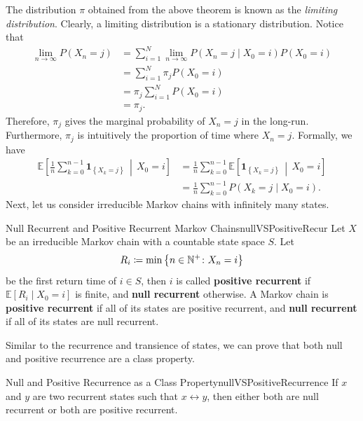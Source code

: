 \documentclass[math, code]{amznotes}
\theoremstyle{remark}
\begin{document}
The distribution $\pi$ obtained from the above theorem is known as the \textit{limiting distribution}. Clearly, a limiting distribution is a stationary distribution. Notice that 
\begin{align*}
    \lim_{n \to \infty}P\left(X_n = j\right) & = \sum_{i = 1}^{N} \lim_{n \to \infty}P\left(X_n = j \mid X_0 = i\right)P\left(X_0 = i\right) \\
    & = \sum_{i = 1}^{N}\pi_jP\left(X_0 = i\right) \\
    & = \pi_j\sum_{i = 1}^{N}P\left(X_0 = i\right) \\
    & = \pi_j.
\end{align*}
Therefore, $\pi_j$ gives the marginal probability of $X_n = j$ in the long-run. Furthermore, $\pi_j$ is intuitively the proportion of time where $X_n = j$. Formally, we have 
\begin{align*}
    \mathbb{E}\left[\frac{1}{n}\sum_{k = 0}^{n - 1}\mathbf{1}_{\left\{X_k = j\right\}} \,\middle\vert\, X_0 = i\right] & = \frac{1}{n}\sum_{k = 0}^{n - 1}\mathbb{E}\left[\mathbf{1}_{\left\{X_k = j\right\}} \,\middle\vert\, X_0 = i\right] \\
    & = \frac{1}{n}\sum_{k = 0}^{n - 1}P\left(X_k = j \mid X_0 = i\right).
\end{align*}
Next, let us consider irreducible Markov chains with infinitely many states.
\begin{dfnbox}{Null Recurrent and Positive Recurrent Markov Chains}{nullVSPositiveRecur}
    Let $X$ be an irreducible Markov chain with a countable state space $S$. Let 
    \begin{equation*}
        R_i \coloneqq \min\left\{n \in \mathbb{N}^+ \colon X_n = i\right\}
    \end{equation*}
    be the first return time of $i \in S$, then $i$ is called {\color{red} \textbf{positive recurrent}} if $\mathbb{E}\left[R_i \mid X_0 = i\right]$ is finite, and {\color{red} \textbf{null recurrent}} otherwise. A Markov chain is {\color{red} \textbf{positive recurrent}} if all of its states are positive recurrent, and {\color{red} \textbf{null recurrent}} if all of its states are null recurrent.
\end{dfnbox}
Similar to the recurrence and transience of states, we can prove that both null and positive recurrence are a class property.
\begin{probox}{Null and Positive Recurrence as a Class Property}{nullVSPositiveRecurrence}
    If $x$ and $y$ are two recurrent states such that $x\leftrightarrow y$, then either both are null recurrent or both are positive recurrent.
\end{probox}
\end{document}
